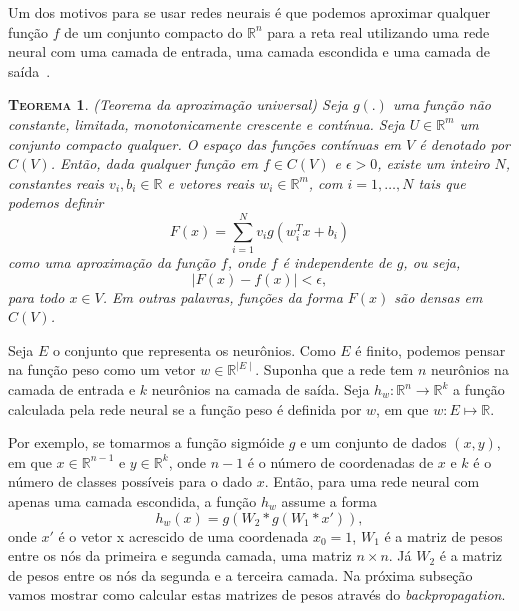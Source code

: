 \documentclass[
	12pt,				%
    oneside,			%
	a4paper,			%
	english,			%
	french,				%
	spanish,			%
	brazil,				%
	]{abntex2}
\newtheorem{theorem}{\scshape Teorema}[section]
\begin{document}
        Um dos motivos para se usar redes neurais é que podemos aproximar qualquer função $f$ de um conjunto compacto do $\mathbb{R}^n$ para a reta real utilizando uma rede neural com uma camada de entrada, uma camada escondida e uma camada de saída~\cite{cybenko}.

        \begin{theorem}{(Teorema da aproximação universal)}
            Seja $g(.)$ uma função não constante, limitada, monotonicamente crescente e contínua. Seja $U\in \mathbb{R}^m$ um conjunto compacto qualquer. O espaço das funções contínuas em $V$ é denotado por $C(V)$. Então, dada qualquer função em $f\in C(V)$ e $\epsilon > 0$, existe um inteiro $N$, constantes reais $v_i, b_i \in \mathbb{R}$ e vetores reais $w_i \in \mathbb{R}^m$, com $i=1,\dots,N$ tais que podemos definir
            \begin{equation*}
                F(x) = \sum_{i=1}^{N}v_i g(w_i^Tx + b_i)
            \end{equation*}
            como uma aproximação da função $f$, onde $f$ é independente de $g$, ou seja,
            \begin{equation*}
                |F(x) - f(x)| < \epsilon,
            \end{equation*}
            para todo $x \in V$. Em outras palavras, funções da forma $F(x)$ são densas em $C(V)$.
        \end{theorem}

        Seja $E$ o conjunto que representa os neurônios. Como $E$ é finito, podemos pensar na função peso como um vetor $w \in \mathbb{R}^{\mid E \mid}$. Suponha que a rede tem $n$ neurônios na camada de entrada e $k$ neurônios na camada de saída. Seja $h_w: \mathbb{R}^n \to \mathbb{R}^k$ a função calculada pela rede neural se a função peso é definida por $w$, em que $w: E \mapsto \mathbb{R}$.

        Por exemplo, se tomarmos a função sigmóide $g$ e um conjunto de dados $(x,y)$, em que $x \in \mathbb{R}^{n-1}$ e $y\in \mathbb{R}^k$, onde $n-1$ é o número de coordenadas de $x$ e $k$ é o número de classes possíveis para o dado $x$. Então, para uma rede neural com apenas uma camada escondida, a função $h_w$ assume a forma
        \begin{equation*}
            h_w(x) = g(W_2*g(W_1*x')),
        \end{equation*}
        onde $x'$ é o vetor x acrescido de uma coordenada $x_0 = 1$, $W_1$ é a matriz de pesos entre os nós da primeira e segunda camada, uma matriz $n\times n$. Já $W_2$ é a matriz de pesos entre os nós da segunda e a terceira camada. Na próxima subseção vamos mostrar como calcular estas matrizes de pesos através do \emph{backpropagation}.
\end{document}
